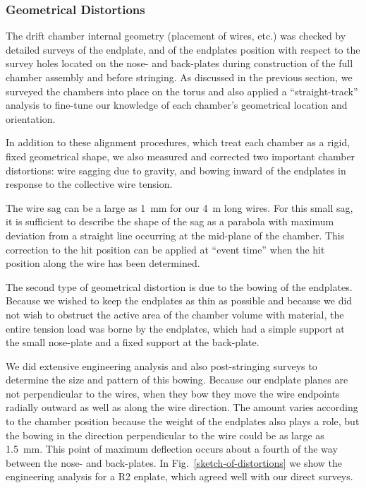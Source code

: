 \subsubsection{Geometrical Distortions}
\label{geom_distortions}

The drift chamber internal geometry (placement of wires, etc.) was checked by detailed
surveys of the endplate, and of the endplates position with respect to the survey holes
located on the nose- and back-plates during construction of the full chamber assembly
and before stringing.
As discussed in the previous section, we surveyed the chambers into place on the
torus and also applied a ``straight-track'' analysis to fine-tune our knowledge
of each chamber's geometrical location and orientation.

In addition to these alignment procedures, which treat each chamber as a rigid, fixed
geometrical shape, we also measured and corrected two important chamber distortions:
wire sagging due to gravity, and bowing inward of the endplates in response to the collective wire tension.

The wire sag can be a large as 1~mm for our 4~m long wires.  For this small
sag, it is sufficient to describe the shape of the sag as a parabola with
maximum deviation from a straight line occurring at the mid-plane of the chamber.
This correction to the hit position can be applied at ``event time'' when the hit position along the wire 
has been determined.

The second type of geometrical distortion is due to the bowing of the endplates.
Because we wished to keep the endplates as thin as possible and because we did
not wish to obstruct the active area of the chamber volume with material, the
entire tension load was borne by the endplates, which had a simple support at the
small nose-plate and a fixed support at the back-plate.

We did extensive engineering analysis and also post-stringing surveys to determine the
size and pattern of this bowing.  Because our endplate planes are not perpendicular to
the wires, when they bow they move the wire endpoints radially outward as well as
along the wire direction.  The amount varies
according to the chamber position because the weight of the endplates also plays a role,
but the bowing in the direction perpendicular to the wire could be as large as 1.5~mm.
This point of maximum deflection occurs about a fourth of the way between the nose- and
back-plates.  In Fig.~\ref{sketch-of-distortions} we show the engineering analysis
for a R2 enplate, which agreed well with our direct surveys.

